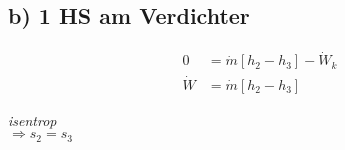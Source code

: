 \subsection*{b) 1 HS am Verdichter}

\begin{align*}
0 &= \dot{m} \left[ h_2 - h_3 \right] - \dot{W}_k \\
\dot{W} &= \dot{m} \left[ h_2 - h_3 \right]
\end{align*}

\textit{isentrop} \\
\(\Rightarrow s_2 = s_3\)